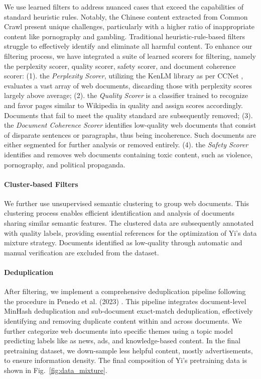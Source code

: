 We use learned filters to address nuanced cases that exceed the capabilities of standard heuristic rules. Notably, the Chinese content extracted from Common Crawl present unique challenges, particularly with a higher ratio of inappropriate content like pornography and gambling. Traditional heuristic-rule-based filters struggle to effectively identify and eliminate all harmful content. To enhance our filtering process, we have integrated a suite of learned scorers for filtering, namely the perplexity scorer, quality scorer, safety scorer, and document coherence scorer:
(1). the \textit{Perplexity Scorer}, utilizing the KenLM library as per CCNet \citep{wenzek2019ccnet}, evaluates a vast array of web documents, discarding those with perplexity scores largely above average;
(2). the \textit{Quality Scorer} is a classifier trained to recognize and favor pages similar to Wikipedia in quality and assign scores accordingly. Documents that fail to meet the quality standard are subsequently removed;
(3). the \textit{Document Coherence Scorer} identifies low-quality web documents that consist of disparate sentences or paragraphs, thus being incoherence. Such documents are either segmented for further analysis or removed entirely. 
(4). the \textit{Safety Scorer} identifies and removes web documents containing toxic content, such as violence, pornography, and political propaganda.

\paragraph{Cluster-based Filters} 
We further use unsupervised semantic clustering to group web documents. This clustering process enables efficient identification and analysis of documents sharing similar semantic features. The clustered data are subsequently annotated with quality labels, providing essential references for the optimization of Yi's data mixture strategy. Documents identified as low-quality through automatic and manual verification are excluded from the dataset.

\paragraph{Deduplication} 
After filtering, we implement a comprehensive deduplication pipeline following the procedure in Penedo et al. (2023) \citep{penedo2023refinedweb}. This pipeline integrates document-level MinHash deduplication and sub-document exact-match deduplication, effectively identifying and removing duplicate content within and across documents. We further categorize web documents into specific themes using a topic model predicting labels like as news, ads, and knowledge-based content. In the final pretraining dataset, we down-sample less helpful content, mostly advertisements, to ensure information density. The final composition of Yi's pretraining data  is shown in Fig.~\ref{fig:data_mixture}.


